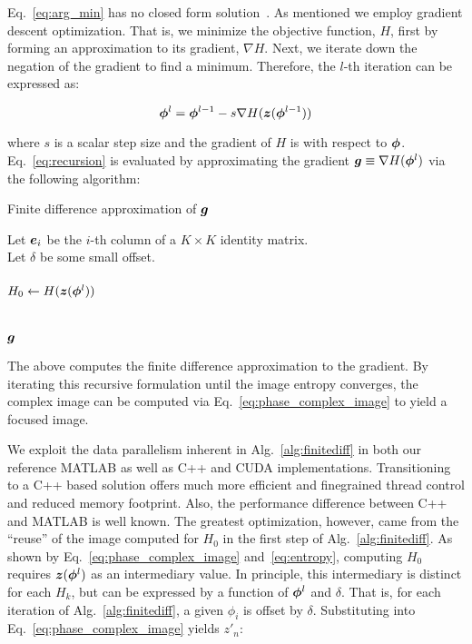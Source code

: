 Eq.~\ref{eq:arg_min} has no closed form solution~\cite{ash2012autofocus}. As
mentioned we employ gradient descent optimization. That is, we minimize the
objective function, $H$, first by forming an approximation to its gradient,
$\nabla H$. Next, we iterate down the negation of the gradient to find a
minimum. Therefore, the $l$-th iteration can be expressed as:

\begin{equation}\label{eq:recursion}
  \bm{\phi}^l = \bm{\phi}^{l-1} - s \nabla H(\bm{z}(\bm{\phi}^{l-1}))
\end{equation}

where $s$ is a scalar step size and the gradient of $H$ is with respect to
$\bm{\phi}$. Eq.~\ref{eq:recursion} is evaluated by approximating the gradient
$\bm{g} \equiv \nabla H(\bm{\phi}^{l})$ via the following algorithm:

\begin{algorithm}
  \caption{Finite difference approximation of $\bm{g}$}
  \label{alg:finitediff}
  Let $\bm{e}_i$ be the $i$-th column of a $K \times K$ identity matrix.\\
  Let $\delta$ be some small offset.\\
  \ \\
  $H_0 \gets H(\bm{z}(\bm{\phi}^l))$\\
  \ \\
  \ \\
  \Return $\bm{g}$
  \vspace{5 mm}
\end{algorithm}

The above computes the finite difference approximation to the gradient. By
iterating this recursive formulation until the image entropy converges, the
complex image can be computed via Eq.~\ref{eq:phase_complex_image} to yield a
focused image.
 
We exploit the data parallelism inherent in Alg.~\ref{alg:finitediff} in both
our reference MATLAB as well as C++ and CUDA implementations. Transitioning to a
C++ based solution offers much more efficient and finegrained thread control and
reduced memory footprint. Also, the performance difference between C++ and
MATLAB is well known. The greatest optimization, however, came from the
``reuse'' of the image computed for $H_0$ in the first step of
Alg.~\ref{alg:finitediff}. As shown by Eq.~\ref{eq:phase_complex_image}
and~\ref{eq:entropy}, computing $H_0$ requires $\bm{z}(\bm{\phi}^l)$ as an
intermediary value. In principle, this intermediary is distinct for each $H_k$,
but can be expressed by a function of $\bm{\phi}^l$ and $\delta$. That is, for each
iteration of Alg.~\ref{alg:finitediff}, a given $\phi_{i}$ is offset by $\delta$.
Substituting into Eq.~\ref{eq:phase_complex_image} yields $z'_n$:

